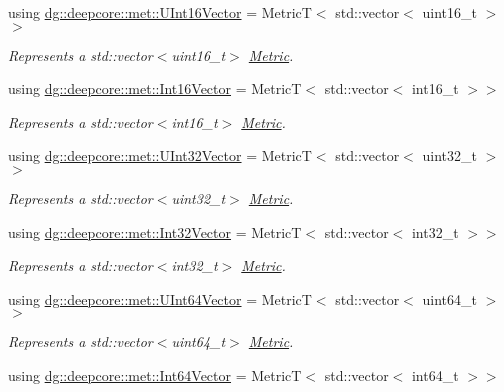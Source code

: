 \begin{DoxyCompactItemize}
using \hyperlink{group___process_metrics_ga188c9966929f876ed38fceadf000c0cd}{dg\+::deepcore\+::met\+::\+U\+Int16\+Vector} = MetricT$<$ std\+::vector$<$ uint16\+\_\+t $>$$>$
\begin{DoxyCompactList}\small\item\em Represents a {\ttfamily std\+::vector$<$uint16\+\_\+t$>$} \hyperlink{classdg_1_1deepcore_1_1_metric}{Metric}. \end{DoxyCompactList}\item 
using \hyperlink{group___process_metrics_ga657cf9643cfa30f7616a44f6d240966c}{dg\+::deepcore\+::met\+::\+Int16\+Vector} = MetricT$<$ std\+::vector$<$ int16\+\_\+t $>$$>$
\begin{DoxyCompactList}\small\item\em Represents a {\ttfamily std\+::vector$<$int16\+\_\+t$>$} \hyperlink{classdg_1_1deepcore_1_1_metric}{Metric}. \end{DoxyCompactList}\item 
using \hyperlink{group___process_metrics_ga6149d91758b5b2efea24946ce8017e00}{dg\+::deepcore\+::met\+::\+U\+Int32\+Vector} = MetricT$<$ std\+::vector$<$ uint32\+\_\+t $>$$>$
\begin{DoxyCompactList}\small\item\em Represents a {\ttfamily std\+::vector$<$uint32\+\_\+t$>$} \hyperlink{classdg_1_1deepcore_1_1_metric}{Metric}. \end{DoxyCompactList}\item 
using \hyperlink{group___process_metrics_gad3e39491733d99cfde41c0cb422cd8a8}{dg\+::deepcore\+::met\+::\+Int32\+Vector} = MetricT$<$ std\+::vector$<$ int32\+\_\+t $>$$>$
\begin{DoxyCompactList}\small\item\em Represents a {\ttfamily std\+::vector$<$int32\+\_\+t$>$} \hyperlink{classdg_1_1deepcore_1_1_metric}{Metric}. \end{DoxyCompactList}\item 
using \hyperlink{group___process_metrics_gab60bfff8e0160f83141f8685fc56c2a2}{dg\+::deepcore\+::met\+::\+U\+Int64\+Vector} = MetricT$<$ std\+::vector$<$ uint64\+\_\+t $>$$>$
\begin{DoxyCompactList}\small\item\em Represents a {\ttfamily std\+::vector$<$uint64\+\_\+t$>$} \hyperlink{classdg_1_1deepcore_1_1_metric}{Metric}. \end{DoxyCompactList}\item 
using \hyperlink{group___process_metrics_ga3ddb8408babcd7b925afa426f1d9e32c}{dg\+::deepcore\+::met\+::\+Int64\+Vector} = MetricT$<$ std\+::vector$<$ int64\+\_\+t $>$$>$

\end{DoxyCompactItemize}
